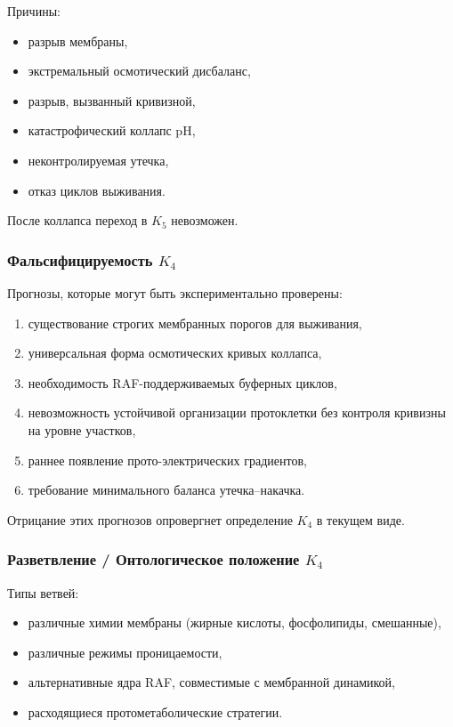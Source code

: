 {Причины:
\begin{itemize}
    \item разрыв мембраны,
    \item экстремальный осмотический дисбаланс,
    \item разрыв, вызванный кривизной,
    \item катастрофический коллапс pH,
    \item неконтролируемая утечка,
    \item отказ циклов выживания.
\end{itemize}

После коллапса переход в $K_5$ невозможен.

\subsubsection{Фальсифицируемость \texorpdfstring{$K_4$}{K_4}}

Прогнозы, которые могут быть экспериментально проверены:
\begin{enumerate}
    \item существование строгих мембранных порогов для выживания,
    \item универсальная форма осмотических кривых коллапса,
    \item необходимость RAF-поддерживаемых буферных циклов,
    \item невозможность устойчивой организации протоклетки без контроля
          кривизны на уровне участков,
    \item раннее появление прото-электрических градиентов,
    \item требование минимального баланса утечка–накачка.
\end{enumerate}

Отрицание этих прогнозов опровергнет определение $K_4$ в текущем виде.

\subsubsection{Разветвление / Онтологическое положение \texorpdfstring{$K_4$}{K_4}}

Типы ветвей:
\begin{itemize}
    \item различные химии мембраны (жирные кислоты, фосфолипиды,
          смешанные),
    \item различные режимы проницаемости,
    \item альтернативные ядра RAF, совместимые с мембранной динамикой,
    \item расходящиеся протометаболические стратегии.
\end{itemize}

}
